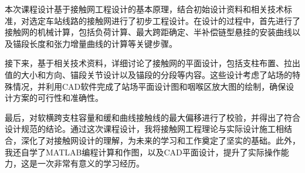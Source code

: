 \acknowledgement
本次课程设计基于接触网工程设计的基本原理，结合初始设计资料和相关技术标准，对选定车站线路的接触网进行了初步工程设计。在设计的过程中，首先进行了接触网的机械计算，包括负荷计算、最大跨距确定、半补偿链型悬挂的安装曲线以及锚段长度和张力增量曲线的计算等关键步骤。

接下来，基于相关技术资料，详细讨论了接触网的平面设计，包括支柱布置、拉出值的大小和方向、锚段关节设计以及锚段的分段等内容。这些设计考虑了站场的特殊情况，并利用CAD软件完成了站场平面设计图和咽喉区放大图的绘制，确保设计方案的可行性和准确性。

最后，对软横跨支柱容量和缓和曲线接触线的最大偏移进行了校验，并得出了符合设计规范的结论。通过这次课程设计，我将接触网工程理论与实际设计施工相结合，深化了对接触网设计的理解，为未来的学习和工作奠定了坚实的基础。此外，我还自学了MATLAB编程计算和作图，以及CAD平面设计，提升了实际操作能力，这是一次非常有意义的学习经历。